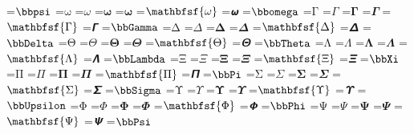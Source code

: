 \documentclass{article}
\begin{document}
=\hbox{$\bbpsi $}
=\hbox{$\mathrm{\omega}$}
=\hbox{$\mathit{\omega}$}
=\hbox{$\mathbf{\omega}$}
=\hbox{$\mathbfup{\omega}$}
=\hbox{$\mathbfsf{\omega}$}
=\hbox{$\mathbfsfit{\omega}$}
=\hbox{$\bbomega $}
=\hbox{$\mathrm{\Gamma}$}
=\hbox{$\mathit{\Gamma}$}
=\hbox{$\mathbf{\Gamma}$}
=\hbox{$\mathbfit{\Gamma}$}
=\hbox{$\mathbfsf{\Gamma}$}
=\hbox{$\mathbfsfit{\Gamma}$}
=\hbox{$\bbGamma $}
=\hbox{$\mathrm{\Delta}$}
=\hbox{$\mathit{\Delta}$}
=\hbox{$\mathbf{\Delta}$}
=\hbox{$\mathbfit{\Delta}$}
=\hbox{$\mathbfsf{\Delta}$}
=\hbox{$\mathbfsfit{\Delta}$}
=\hbox{$\bbDelta $}
=\hbox{$\mathrm{\Theta}$}
=\hbox{$\mathit{\Theta}$}
=\hbox{$\mathbf{\Theta}$}
=\hbox{$\mathbfit{\Theta}$}
=\hbox{$\mathbfsf{\Theta}$}
=\hbox{$\mathbfsfit{\Theta}$}
=\hbox{$\bbTheta $}
=\hbox{$\mathrm{\Lambda}$}
=\hbox{$\mathit{\Lambda}$}
=\hbox{$\mathbf{\Lambda}$}
=\hbox{$\mathbfit{\Lambda}$}
=\hbox{$\mathbfsf{\Lambda}$}
=\hbox{$\mathbfsfit{\Lambda}$}
=\hbox{$\bbLambda $}
=\hbox{$\mathrm{\Xi}$}
=\hbox{$\mathit{\Xi}$}
=\hbox{$\mathbf{\Xi}$}
=\hbox{$\mathbfit{\Xi}$}
=\hbox{$\mathbfsf{\Xi}$}
=\hbox{$\mathbfsfit{\Xi}$}
=\hbox{$\bbXi $}
=\hbox{$\mathrm{\Pi}$}
=\hbox{$\mathit{\Pi}$}
=\hbox{$\mathbf{\Pi}$}
=\hbox{$\mathbfit{\Pi}$}
=\hbox{$\mathbfsf{\Pi}$}
=\hbox{$\mathbfsfit{\Pi}$}
=\hbox{$\bbPi $}
=\hbox{$\mathrm{\Sigma}$}
=\hbox{$\mathit{\Sigma}$}
=\hbox{$\mathbf{\Sigma}$}
=\hbox{$\mathbfit{\Sigma}$}
=\hbox{$\mathbfsf{\Sigma}$}
=\hbox{$\mathbfsfit{\Sigma}$}
=\hbox{$\bbSigma $}
=\hbox{$\mathrm{\Upsilon}$}
=\hbox{$\mathit{\Upsilon}$}
=\hbox{$\mathbf{\Upsilon}$}
=\hbox{$\mathbfit{\Upsilon}$}
=\hbox{$\mathbfsf{\Upsilon}$}
=\hbox{$\mathbfsfit{\Upsilon}$}
=\hbox{$\bbUpsilon $}
=\hbox{$\mathrm{\Phi}$}
=\hbox{$\mathit{\Phi}$}
=\hbox{$\mathbf{\Phi}$}
=\hbox{$\mathbfit{\Phi}$}
=\hbox{$\mathbfsf{\Phi}$}
=\hbox{$\mathbfsfit{\Phi}$}
=\hbox{$\bbPhi $}
=\hbox{$\mathrm{\Psi}$}
=\hbox{$\mathit{\Psi}$}
=\hbox{$\mathbf{\Psi}$}
=\hbox{$\mathbfit{\Psi}$}
=\hbox{$\mathbfsf{\Psi}$}
=\hbox{$\mathbfsfit{\Psi}$}
=\hbox{$\bbPsi $}
\end{document}
